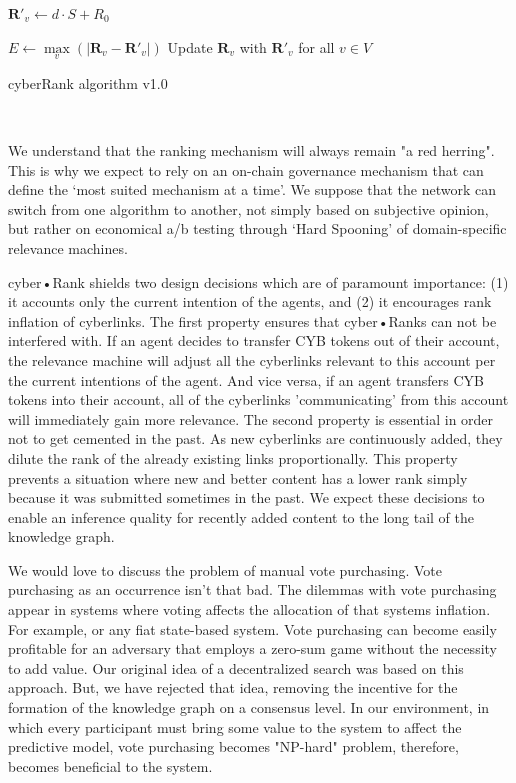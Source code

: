 \documentclass[8pt,oneside]{amsart}
\newcommand{\linkgreen}[2]{\href{#1}{\color{green}{#2}}}
\begin{document}
\begin{Abstract}
\begin{algorithm}
{{$\textbf{R}'_v \leftarrow d \cdot S + R_{0}$ \;

}

\BlankLine
$E \leftarrow \max\limits_v(|\textbf{R}_v - \textbf{R}'_v|)$ \;
Update $\textbf{R}_{v}$ with $\textbf{R}'_{v}$ for all $v \in V$\;

}

\caption{cyberRank algorithm v1.0}\label{algo_disjdecomp}
\end{algorithm}\

We understand that the ranking mechanism will always remain "a red herring". This is why we expect to rely on an on-chain governance mechanism that can define the ‘most suited mechanism at a time’. We suppose that the network can switch from one algorithm to another, not simply based on subjective opinion, but rather on economical a/b testing through ‘Hard Spooning’ of domain-specific relevance machines.

cyber•Rank shields two design decisions which are of paramount importance: (1) it accounts only the current intention of the agents, and (2) it encourages rank inflation of cyberlinks. The first property ensures that cyber•Ranks can not be interfered with. If an agent decides to transfer CYB tokens out of their account, the relevance machine will adjust all the cyberlinks relevant to this account per the current intentions of the agent. And vice versa, if an agent transfers CYB tokens into their account, all of the cyberlinks 'communicating' from this account will immediately gain more relevance. The second property is essential in order not to get cemented in the past. As new cyberlinks are continuously added, they dilute the rank of the already existing links proportionally. This property prevents a situation where new and better content has a lower rank simply because it was submitted sometimes in the past. We expect these decisions to enable an inference quality for recently added content to the long tail of the knowledge graph.

We would love to discuss the problem of manual vote purchasing. Vote purchasing as an occurrence isn't that bad. The dilemmas with vote purchasing appear in systems where voting affects the allocation of that systems inflation. For example, \linkgreen{http://ipfs.io/ipfs/QmepU77tqMAHHuiSASUvUnu8f8ENuPF2Kfs97WjLn8vAS3}{Steem}
or any fiat state-based system. Vote purchasing can become easily profitable for an adversary that employs a zero-sum game without the necessity to add value. Our original idea of a decentralized search was based on this approach. But, we have rejected that idea, removing the incentive for the formation of the knowledge graph on a consensus level. In our environment, in which every participant must bring some value to the system to affect the predictive model, vote purchasing becomes "NP-hard" problem, therefore, becomes beneficial to the system.


\end{Abstract}
\end{document}

